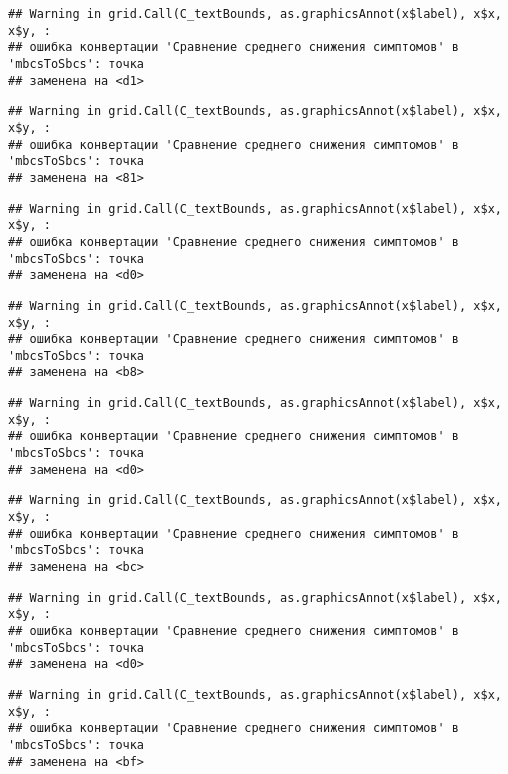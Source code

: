 \documentclass[
]{article}
\begin{document}
\begin{verbatim}
## Warning in grid.Call(C_textBounds, as.graphicsAnnot(x$label), x$x, x$y, :
## ошибка конвертации 'Сравнение среднего снижения симптомов' в 'mbcsToSbcs': точка
## заменена на <d1>
\end{verbatim}

\begin{verbatim}
## Warning in grid.Call(C_textBounds, as.graphicsAnnot(x$label), x$x, x$y, :
## ошибка конвертации 'Сравнение среднего снижения симптомов' в 'mbcsToSbcs': точка
## заменена на <81>
\end{verbatim}

\begin{verbatim}
## Warning in grid.Call(C_textBounds, as.graphicsAnnot(x$label), x$x, x$y, :
## ошибка конвертации 'Сравнение среднего снижения симптомов' в 'mbcsToSbcs': точка
## заменена на <d0>
\end{verbatim}

\begin{verbatim}
## Warning in grid.Call(C_textBounds, as.graphicsAnnot(x$label), x$x, x$y, :
## ошибка конвертации 'Сравнение среднего снижения симптомов' в 'mbcsToSbcs': точка
## заменена на <b8>
\end{verbatim}

\begin{verbatim}
## Warning in grid.Call(C_textBounds, as.graphicsAnnot(x$label), x$x, x$y, :
## ошибка конвертации 'Сравнение среднего снижения симптомов' в 'mbcsToSbcs': точка
## заменена на <d0>
\end{verbatim}

\begin{verbatim}
## Warning in grid.Call(C_textBounds, as.graphicsAnnot(x$label), x$x, x$y, :
## ошибка конвертации 'Сравнение среднего снижения симптомов' в 'mbcsToSbcs': точка
## заменена на <bc>
\end{verbatim}

\begin{verbatim}
## Warning in grid.Call(C_textBounds, as.graphicsAnnot(x$label), x$x, x$y, :
## ошибка конвертации 'Сравнение среднего снижения симптомов' в 'mbcsToSbcs': точка
## заменена на <d0>
\end{verbatim}

\begin{verbatim}
## Warning in grid.Call(C_textBounds, as.graphicsAnnot(x$label), x$x, x$y, :
## ошибка конвертации 'Сравнение среднего снижения симптомов' в 'mbcsToSbcs': точка
## заменена на <bf>
\end{verbatim}
\end{document}
